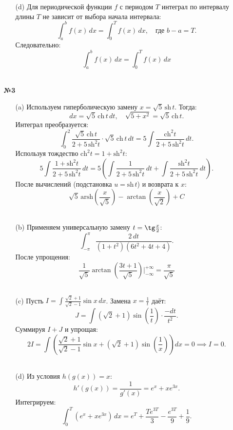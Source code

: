 \documentclass[a4paper]{article}
\begin{document}
\begin{enumerate}
\begin{enumerate}
        \item[(d)]Для периодической функции \(f\) с периодом \(T\) интеграл по интервалу длины \(T\) не зависит от выбора начала интервала:  
        \[
        \int_a^b f(x) \, dx = \int_0^T f(x) \, dx, \quad \text{где } b - a = T.
        \]
        Следовательно:
        $$\int_a^b f(x) \, dx = \int_0^T f(x) \, dx$$\\
    \end{enumerate}

    \item[\textbf{№3}]\begin{enumerate}
        \item[(a)]Используем гиперболическую замену \(x = \sqrt{5} \, \text{sh} \, t\). Тогда:  
        \[
        dx = \sqrt{5} \, \text{ch} \, t \, dt, \quad \sqrt{5 + x^2} = \sqrt{5} \, \text{ch} \, t.
        \]  
        Интеграл преобразуется:  
        \[
        \int_0^2 \frac{\sqrt{5} \, \text{ch} \, t}{2 + 5 \, \text{sh}^2 t} \cdot \sqrt{5} \, \text{ch} \, t \, dt = 5 \int \frac{\text{ch}^2 t}{2 + 5 \, \text{sh}^2 t} \, dt.
        \]  
        Используя тождество \(\text{ch}^2 t = 1 + \text{sh}^2 t\):  
        \[
        5 \int \frac{1 + \text{sh}^2 t}{2 + 5 \, \text{sh}^2 t} \, dt = 5 \left( \int \frac{1}{2 + 5 \, \text{sh}^2 t} \, dt + \int \frac{\text{sh}^2 t}{2 + 5 \, \text{sh}^2 t} \, dt \right).
        \]  
        После вычислений (подстановка \(u = \text{sh} \, t\)) и возврата к \(x\):  
        \[
        \sqrt{5} \, \text{arsh}\left(\frac{x}{\sqrt{5}}\right) - 
        \arctan\left(\frac{x}{\sqrt{2}}\right) + C
        \]\\

        \item[(b)]Применяем универсальную замену \(t = \tg \frac{x}{2}\):  
        \[
        \int_{-\pi}^\pi \frac{2 \, dt}{(1 + t^2)(6t^2 + 4t + 4)}.
        \]  
        После упрощения:  
        \[
        \frac{1}{\sqrt{5}} \arctan\left(\frac{3t + 1}{\sqrt{5}}\right) \Bigg|_{-\infty}^{+\infty} = \frac{\pi}{\sqrt{5}}
        \]  \\

        \item[(c)]Пусть \(I = \int \frac{\sqrt{2} + 1}{\sqrt{2} - 1} \sin x \, dx\). Замена \(x = \frac{1}{t}\) даёт:  
        \[
        J = \int (\sqrt{2} + 1) \sin\left(\frac{1}{t}\right) \cdot \frac{-dt}{t^2}.
        \]  
        Суммируя \(I + J\) и упрощая:  
        \[
        2I = \int \left(\frac{\sqrt{2} + 1}{\sqrt{2} - 1} \sin x + (\sqrt{2} + 1) \sin\left(\frac{1}{x}\right)\right) dx = 0 \implies I = 0.
        \]  \\

        \item[(d)]Из условия \(h(g(x)) = x\):  
        \[
        h'(g(x)) = \frac{1}{g'(x)} = e^x + xe^{3x}.
        \]  
        Интегрируем:  
        \[
        \int_0^T (e^x + xe^{3x}) \, dx = e^T + \frac{T e^{3T}}{3} - \frac{e^{3T}}{9} + \frac{1}{9}.
        \]  

    \end{enumerate}

\end{enumerate}
\end{document}
